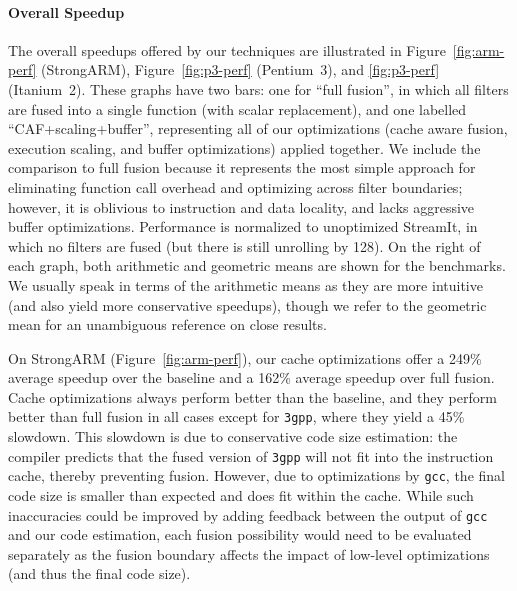 \paragraph*{Overall Speedup} 
The overall speedups offered by our techniques are illustrated in
Figure~\ref{fig:arm-perf} (StrongARM), Figure~\ref{fig:p3-perf}
(Pentium~3), and \ref{fig:p3-perf} (Itanium~2).  These graphs have two
bars: one for ``full fusion'', in which all filters are fused into a
single function (with scalar replacement), and one labelled
``CAF+scaling+buffer'', representing all of our optimizations (cache
aware fusion, execution scaling, and buffer optimizations) applied
together.  We include the comparison to full fusion because it
represents the most simple approach for eliminating function call
overhead and optimizing across filter boundaries; however, it is
oblivious to instruction and data locality, and lacks aggressive
buffer optimizations.  Performance is normalized to unoptimized
StreamIt, in which no filters are fused (but there is still unrolling
by 128).  On the right of each graph, both arithmetic and geometric
means are shown for the benchmarks.  We usually speak in terms of the
arithmetic means as they are more intuitive (and also yield more
conservative speedups), though we refer to the geometric mean for an
unambiguous reference on close results.

On StrongARM (Figure~\ref{fig:arm-perf}), our cache optimizations
offer a 249\% average speedup over the baseline and a 162\%
average speedup over full fusion.  Cache optimizations always perform
better than the baseline, and they perform better than full fusion in
all cases except for \texttt{3gpp}, where they yield a 45\% slowdown.
This slowdown is due to conservative code size estimation: the
compiler predicts that the fused version of \texttt{3gpp} will not fit
into the instruction cache, thereby preventing fusion.  However, due
to optimizations by {\tt gcc}, the final code size is smaller than
expected and does fit within the cache.  While such inaccuracies could
be improved by adding feedback between the output of {\tt gcc} and our
code estimation, each fusion possibility would need to be evaluated
separately as the fusion boundary affects the impact of low-level
optimizations (and thus the final code size).


